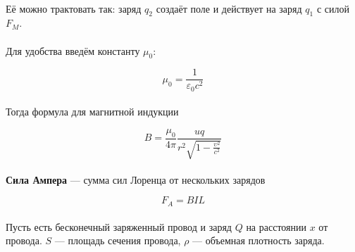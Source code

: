 \documentclass{article}
\begin{document}
\paragraph{}

Её можно трактовать так: заряд $q_2$ создаёт поле и действует на заряд $q_1$ с силой $F_M$.

\paragraph{}

Для удобства введём константу $\mu_0$:

\begin{equation*}
  \mu_0 = \frac{1}{\varepsilon_0c^2}
\end{equation*}
\paragraph{}

Тогда формула для магнитной индукции

\begin{equation*}
  B = \frac{\mu_0}{4\pi}\frac{uq}{r^2\sqrt{1-\frac{\upsilon^2}{c^2}}}
\end{equation*}
\paragraph{}

\textbf{Сила Ампера} --- сумма сил Лоренца от нескольких зарядов

\begin{equation*}
  F_A = BIL
\end{equation*}

\newpage

\paragraph{}
Пусть есть бесконечный заряженный провод и заряд $Q$ на расстоянии $x$ от провода. $S$ --- площадь
сечения провода, $\rho$ --- объемная плотность заряда.
\end{document}
